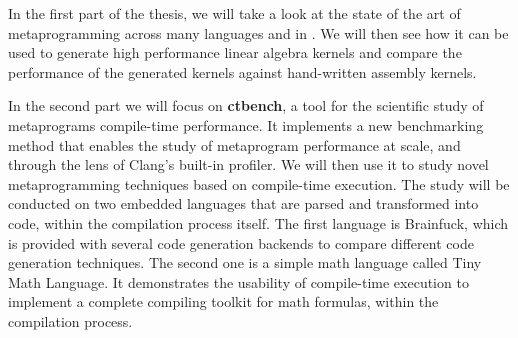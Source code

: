 \documentclass[main]{subfiles}
\begin{document}
In the first part of the thesis, we will take a look at the state of the art of
metaprogramming across many languages and in \cpp.
We will then see how it can be used to generate high performance linear algebra
kernels and compare the performance of the generated kernels against
hand-written assembly kernels.

In the second part we will focus on \textbf{ctbench}, a tool for the scientific
study of \cpp metaprograms compile-time performance. It implements a new
benchmarking method that enables the study of metaprogram performance
at scale, and through the lens of Clang's built-in profiler.
We will then use it to study novel \cpp metaprogramming techniques based on
compile-time \cpp execution. The study will be conducted on two embedded
languages that are parsed and transformed into \cpp code, within the \cpp
compilation process itself.
The first language is Brainfuck, which is provided with several code generation
backends to compare different code generation techniques. The second one
is a simple math language called Tiny Math Language. It demonstrates
the usability of compile-time \cpp execution to implement a complete compiling
toolkit for math formulas, within the \cpp compilation process.
\end{document}
